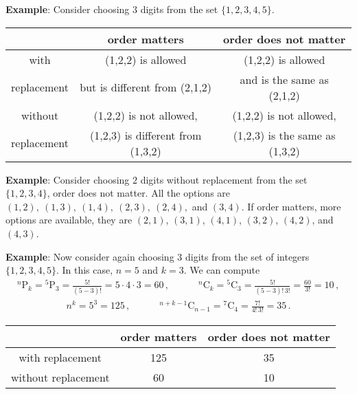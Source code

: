 \documentclass[11pt,oneside]{book}
\theoremstyle{newStyle}
\begin{document}
\vspace{2cm}
\textbf{Example}:
Consider choosing $3$ digits from the set $\{1,2,3,4,5\}$. 
\begin{center}
\begin{tabular}{|c|c|c|}
\hline \rowcolor{lightgray}
 & order matters & order does not matter\\
\hline
\cellcolor{lightgray} with &(1,2,2) is allowed & (1,2,2) is allowed\\
\cellcolor{lightgray} replacement &  but is different from (2,1,2) &  and is the same as (2,1,2)\\
\hline
\cellcolor{lightgray} without &(1,2,2) is not allowed, & (1,2,2) is not allowed,\\
\cellcolor{lightgray} replacement & (1,2,3) is different from (1,3,2) &  (1,2,3) is the same as (1,3,2)\\
\hline
\end{tabular}
\end{center}

\vspace{2cm}
\textbf{Example}:
Consider choosing $2$ digits without replacement from the set $\{1,2,3,4\}$, order does not matter. All the options are $
(1,2),\ (1,3),\ (1,4),\ (2,3),\ (2,4),$ and $(3,4)$. If order matters, more options are available, they are $(2,1)$, $(3,1)$, $(4,1)$, $(3,2)$, $(4,2)$, and $(4,3)$. 

\vspace{2cm}

\textbf{Example}: 
Now consider again choosing $3$ digits from the set of integers $\{1,2,3,4,5\}$. In this case, $n=5$ and $k=3$. We can compute
\begin{align*}
^n\text{P}_k = 
{}^5\text{P}_3 = \frac{5!}{(5-3)!} = 5\cdot 4 \cdot 3 = 60\,, \qquad\quad
^n\text{C}_k = {}^5\text{C}_3
=\frac{5!}{(5-3)!\, 3!} = \frac{60}{3!} = 10\,,
\end{align*}
\begin{align*}
n^k  = 5^3 = 125\,,
\qquad\quad
^{n+k-1}\text{C}_{n-1}=
{}^{7}\text{C}_{4} = \frac{7!}{4!\,3!} = 35\,.
\end{align*}
\begin{center}
\begin{tabular}{|c|c|c|}
\hline \rowcolor{lightgray}
 & order matters & order does not matter\\
\hline
\cellcolor{lightgray} with replacement & 125 & 35\\
\hline
\cellcolor{lightgray} without replacement & 60 & 10\\
\hline
\end{tabular}
\end{center}
\end{document}
